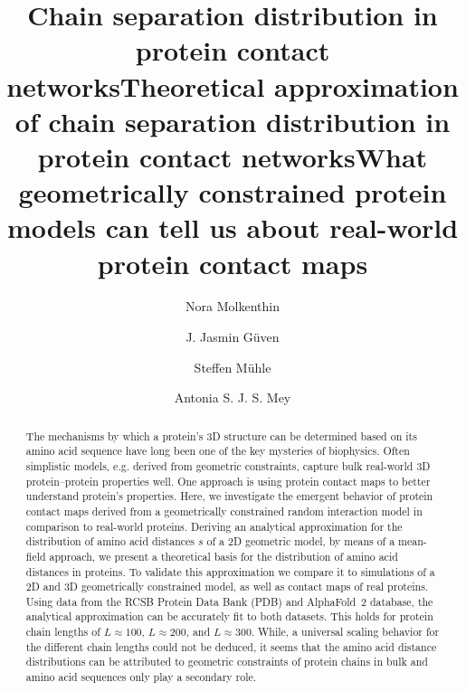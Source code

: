 \documentclass[
reprint,
twocolumn,
amsmath,amssymb,superscriptaddress,aps,
pre]{revtex4-1}
\begin{document}
\title{Chain separation distribution in protein contact networks}
\title{Theoretical approximation of chain separation distribution in protein contact networks}
\title{What geometrically constrained protein models can tell us about real-world protein contact maps}
\author{Nora Molkenthin}
\author{J. Jasmin Güven}
\author{Steffen Mühle}
\author{Antonia S. J. S. Mey}


\begin{abstract}
The mechanisms by which a protein's 3D structure can be determined based on its amino acid sequence have long been one of the key mysteries of biophysics. Often simplistic models, e.g. derived from geometric constraints, capture bulk real-world 3D protein--protein properties well. One approach is using protein contact maps to better understand protein's properties. Here, we investigate the emergent behavior of protein contact maps derived from a geometrically constrained random interaction model in comparison to real-world proteins. Deriving an analytical approximation for the distribution of amino acid distances $s$ of a 2D geometric model, by means of a mean-field approach, we present a theoretical basis for the distribution of amino acid distances in proteins. To validate this approximation we compare it to simulations of a 2D and 3D geometrically constrained model, as well as contact maps of real proteins. Using data from the RCSB Protein Data Bank (PDB) and AlphaFold~2 database, the analytical approximation can be accurately fit to both datasets. This holds for protein chain lengths of $L\approx100$, $L\approx200$, and $L\approx300$. While, a universal scaling behavior for the different chain lengths could not be deduced, it seems that the amino acid distance distributions can be attributed to geometric constraints of protein chains in bulk and amino acid sequences only play a secondary role. 



\end{abstract}
\maketitle
\end{document}
